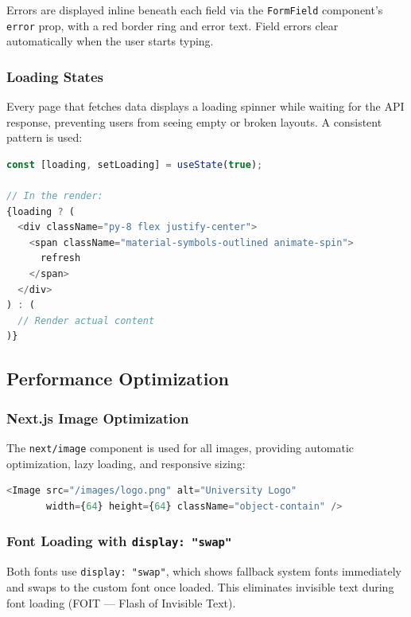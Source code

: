 \documentclass[12pt,a4paper]{article}
\begin{document}
Errors are displayed inline beneath each field via the \texttt{FormField} component's \texttt{error} prop, with a red border ring and error text. Field errors clear automatically when the user starts typing.

\subsubsection{Loading States}

Every page that fetches data displays a loading spinner while waiting for the API response, preventing users from seeing empty or broken layouts. A consistent pattern is used:

\begin{lstlisting}[language=TypeScript,title={Loading state pattern}]
const [loading, setLoading] = useState(true);

// In the render:
{loading ? (
  <div className="py-8 flex justify-center">
    <span className="material-symbols-outlined animate-spin">
      refresh
    </span>
  </div>
) : (
  // Render actual content
)}
\end{lstlisting}

\subsection{Performance Optimization}

\subsubsection{Next.js Image Optimization}

The \texttt{next/image} component is used for all images, providing automatic optimization, lazy loading, and responsive sizing:

\begin{lstlisting}[language=TypeScript,title={Optimized image loading}]
<Image src="/images/logo.png" alt="University Logo"
       width={64} height={64} className="object-contain" />
\end{lstlisting}

\subsubsection{Font Loading with \texttt{display: "swap"}}

Both fonts use \texttt{display: "swap"}, which shows fallback system fonts immediately and swaps to the custom font once loaded. This eliminates invisible text during font loading (FOIT — Flash of Invisible Text).
\end{document}
